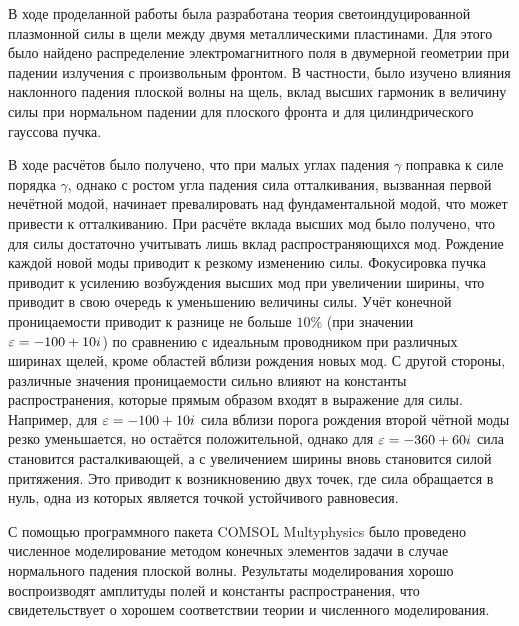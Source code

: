 \conclusion
В ходе проделанной работы была разработана теория светоиндуцированной плазмонной силы в щели между двумя металлическими пластинами. Для этого было найдено распределение электромагнитного поля в двумерной геометрии при падении излучения с произвольным фронтом. В частности, было изучено влияния наклонного падения плоской волны на щель, вклад высших гармоник в величину силы при нормальном падении для плоского фронта и для цилиндрического гауссова пучка. 

В ходе расчётов было получено, что при малых углах падения $\gamma$ поправка к силе порядка $\gamma$, однако с ростом угла падения сила отталкивания, вызванная первой нечётной модой, начинает превалировать над фундаментальной модой, что может привести к отталкиванию. При расчёте вклада высших мод было получено, что для силы достаточно учитывать лишь вклад распространяющихся мод. Рождение каждой новой моды приводит к резкому изменению силы. Фокусировка пучка приводит к усилению возбуждения высших мод при увеличении ширины, что приводит в свою очередь к уменьшению величины силы. Учёт конечной проницаемости приводит к разнице не больше $10\%$ (при значении $\varepsilon = -100 + 10i$) по сравнению с идеальным проводником при различных ширинах щелей, кроме областей вблизи рождения новых мод. С другой стороны, различные  значения проницаемости сильно влияют на константы распространения, которые прямым образом входят в выражение для силы. Например, для $\varepsilon = -100 + 10 i$ сила вблизи порога рождения второй чётной моды резко уменьшается, но остаётся положительной, однако для $\varepsilon = -360 + 60 i$ сила становится расталкивающей, а с увеличением ширины вновь становится силой притяжения. Это приводит к возникновению двух точек, где сила обращается в нуль, одна из которых является точкой устойчивого равновесия. 

С помощью программного пакета COMSOL Multyphysics было проведено численное моделирование методом конечных элементов задачи в случае нормального падения плоской волны. Результаты моделирования хорошо воспроизводят амплитуды полей и константы распространения, что свидетельствует о хорошем соответствии теории и численного моделирования.